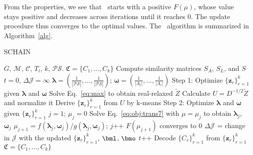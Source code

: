From the properties, we see that \schain\ starts with a positive $F(\mu)$, whose value 
stays positive and decreases across iterations until it reaches 0.
The update procedure thus converges to the optimal values.
The \schain\ algorithm is summarized in Algorithm~\ref{alg}.
\begin{algorithm}
\begin{small}
\caption{SCHAIN}
\label{alg}
\begin{algorithmic}[1]
\Require $G$, $\mathcal{M}$, $\mathcal{C}$, $T_i$, $k$, $\mathcal{PS}$.
\Ensure $\mathfrak{C} = \{C_1, ..., C_k\}$
\State Compute similarity matrices $S_A$, $S_L$, and $S$
\State $t=0$, $\Delta \mathcal{J} = \infty$
\State $\bm \lambda = (\frac{1}{|\mathcal{PS}|}, ..., \frac{1}{|\mathcal{PS}|})$;
$\bm \omega = (\frac{1}{|A_i|}, ..., \frac{1}{|A_i|})$
\LeftComment Step 1: Optimize $\{\bm z_r\}_{r=1}^k$ given {$\bm \lambda$} and $\bm \omega$
\State Solve Eq.~\ref{eq:max} to obtain real-relaxed $\tilde{Z}$
\State Calculate $U=D^{-1/2}\tilde{Z}$ and normalize it
\State Derive $\{{\bm z}_r\}_{r=1}^k$ from $U$ by k-means
\LeftComment Step 2: Optimize {$\bm \lambda$} and $\bm \omega$ given $\{${$\bm z$}$_r\}_{r=1}^k$
\State $j=1$; $\mu_j = 0$
\Repeat
\State Solve Eq.~\ref{eq:obj:trans7} with $\mu = \mu_j$ to obtain ${\bm \lambda}_{j}$, ${\bm \omega}_{j}$
\State $\mu_{j+1} = f({\bm \lambda}_{j}, {\bm \omega}_{j}) / g({\bm \lambda}_{j}, {\bm \omega}_{j})$; $j$++
\Until  $F(\mu_{j+1})$ converges to 0%
\State $\Delta \mathcal{J}$ = change in $\mathcal{J}$ with the updated $\{{\bm z_r}\}_{r=1}^k$, $\bml$, $\bmo$
\State $t$++
\EndWhile
\State Decode $\{C_r\}_{r=1}^k$ from $\{{\bm z_r}\}_{r=1}^k$
\State \Return $\mathfrak{C} = \{C_1, ..., C_k\}$
\end{algorithmic}
\end{small}
\end{algorithm}






